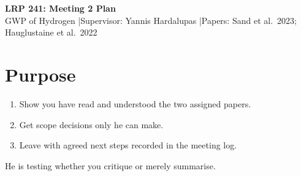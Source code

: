 \documentclass[10pt,a4paper]{article}
\begin{document}
{\Large\bfseries LRP 241: Meeting 2 Plan}\\[0.3ex]
{\small GWP of Hydrogen \quad|\quad Supervisor: Yannis Hardalupas \quad|\quad Papers: Sand et al.\ 2023; Hauglustaine et al.\ 2022}

\section{Purpose}
\begin{enumerate}
  \item Show you have read and understood the two assigned papers.
  \item Get scope decisions only he can make.
  \item Leave with agreed next steps recorded in the meeting log.
\end{enumerate}
He is testing whether you critique or merely summarise.
\end{document}
